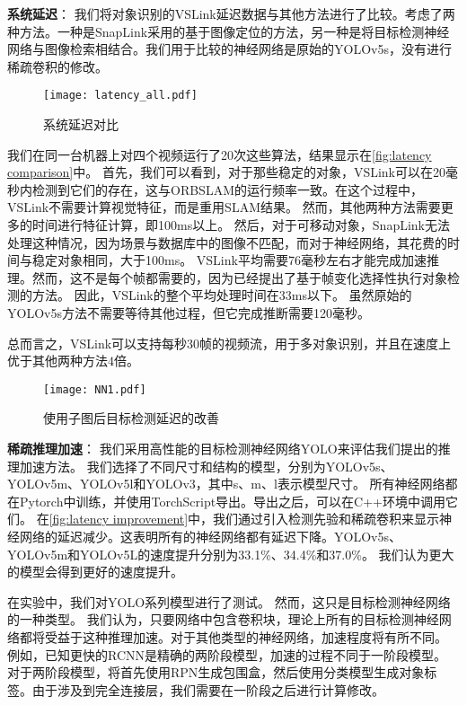 \textbf{系统延迟}：
我们将对象识别的VSLink延迟数据与其他方法进行了比较。考虑了两种方法。一种是SnapLink\cite{chen2018snaplink}采用的基于图像定位的方法，另一种是将目标检测神经网络与图像检索相结合。我们用于比较的神经网络是原始的YOLOv5s\cite{glenn_jocher_2020_4154370}，没有进行稀疏卷积的修改。

\begin{figure}[htbp]
	\centering
	\texttt{[image: latency\_all.pdf]}
	\caption{系统延迟对比}
	\label{fig:latency comparison}
\end{figure}

我们在同一台机器上对四个视频运行了20次这些算法，结果显示在\autoref{fig:latency comparison}中。
首先，我们可以看到，对于那些稳定的对象，VSLink可以在20毫秒内检测到它们的存在，这与ORBSLAM的运行频率一致。在这个过程中，VSLink不需要计算视觉特征，而是重用SLAM结果。
然而，其他两种方法需要更多的时间进行特征计算，即100ms以上。
然后，对于可移动对象，SnapLink无法处理这种情况，因为场景与数据库中的图像不匹配，而对于神经网络，其花费的时间与稳定对象相同，大于100ms。
VSLink平均需要76毫秒左右才能完成加速推理。然而，这不是每个帧都需要的，因为\cite{yao2020video}已经提出了基于帧变化选择性执行对象检测的方法。
因此，VSLink的整个平均处理时间在33ms以下。
虽然原始的YOLOv5s方法不需要等待其他过程，但它完成推断需要120毫秒。
 
总而言之，VSLink可以支持每秒30帧的视频流，用于多对象识别，并且在速度上优于其他两种方法$4$倍。

\begin{figure}[htbp]
	\centering
	\texttt{[image: NN1.pdf]}
	\caption{使用子图后目标检测延迟的改善}
	\label{fig:latency improvement}
\end{figure}

\textbf{稀疏推理加速}：
我们采用高性能的目标检测神经网络YOLO\cite{redmon2016you}来评估我们提出的推理加速方法。
我们选择了不同尺寸和结构的模型，分别为YOLOv5s、YOLOv5m、YOLOv5l和YOLOv3，其中s、m、l表示模型尺寸。
所有神经网络都在Pytorch中训练，并使用TorchScript导出。导出之后，可以在C++环境中调用它们。
在\autoref{fig:latency improvement}中，我们通过引入检测先验和稀疏卷积来显示神经网络的延迟减少。这表明所有的神经网络都有延迟下降。YOLOv5s、YOLOv5m和YOLOv5L的速度提升分别为33.1\%、34.4\%和37.0\%。
我们认为更大的模型会得到更好的速度提升。

在实验中，我们对YOLO系列模型进行了测试。
然而，这只是目标检测神经网络的一种类型。
我们认为，只要网络中包含卷积块，理论上所有的目标检测神经网络都将受益于这种推理加速。对于其他类型的神经网络，加速程度将有所不同。
例如，已知更快的RCNN是精确的两阶段模型，加速的过程不同于一阶段模型。
对于两阶段模型，将首先使用RPN生成包围盒，然后使用分类模型生成对象标签。由于涉及到完全连接层，我们需要在一阶段之后进行计算修改。


